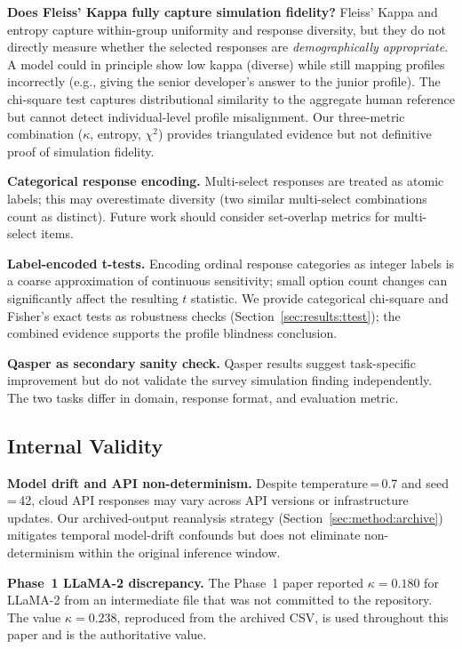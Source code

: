 \documentclass[12pt,a4paper]{article}
\begin{document}
\textbf{Does Fleiss' Kappa fully capture simulation fidelity?}
Fleiss' Kappa and entropy capture within-group uniformity and response
diversity, but they do not directly measure whether the selected
responses are \emph{demographically appropriate}.
A model could in principle show low kappa (diverse) while still mapping
profiles incorrectly (e.g., giving the senior developer's answer to the
junior profile).
The chi-square test captures distributional similarity to the aggregate
human reference but cannot detect individual-level profile misalignment.
Our three-metric combination ($\kappa$, entropy, $\chi^2$) provides
triangulated evidence but not definitive proof of simulation fidelity.

\textbf{Categorical response encoding.}
Multi-select responses are treated as atomic labels; this may
overestimate diversity (two similar multi-select combinations count as
distinct).
Future work should consider set-overlap metrics for multi-select items.

\textbf{Label-encoded t-tests.}
Encoding ordinal response categories as integer labels is a coarse
approximation of continuous sensitivity; small option count changes can
significantly affect the resulting $t$ statistic.
We provide categorical chi-square and Fisher's exact tests as
robustness checks (Section~\ref{sec:results:ttest}); the combined
evidence supports the profile blindness conclusion.

\textbf{Qasper as secondary sanity check.}
Qasper results suggest task-specific improvement but do not
validate the survey simulation finding independently.
The two tasks differ in domain, response format, and evaluation metric.

\subsection{Internal Validity}
\label{sec:threats:internal}

\textbf{Model drift and API non-determinism.}
\label{lim:api}
Despite temperature\,=\,0.7 and seed\,=\,42, cloud API responses may
vary across API versions or infrastructure updates.
Our archived-output reanalysis strategy (Section~\ref{sec:method:archive})
mitigates temporal model-drift confounds but does not eliminate
non-determinism within the original inference window.

\textbf{Phase~1 LLaMA-2 discrepancy.}
The Phase~1 paper reported $\kappa{=}0.180$ for LLaMA-2 from an
intermediate file that was not committed to the repository.
The value $\kappa{=}0.238$, reproduced from the archived CSV, is used
throughout this paper and is the authoritative value.
\end{document}
